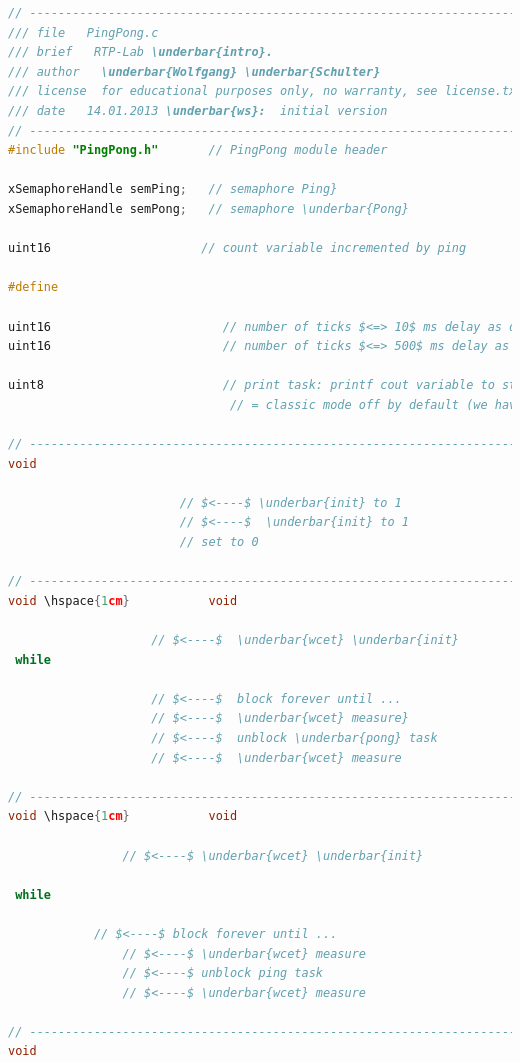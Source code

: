 \begin{lstlisting}[style=mystyle, language=c]
// ----------------------------------------------------------------------------
/// file   PingPong.c
/// brief   RTP-Lab \underbar{intro}.
/// author   \underbar{Wolfgang} \underbar{Schulter} 
/// license  for educational purposes only, no warranty, see license.txt
/// date   14.01.2013 \underbar{ws}:  initial version
// ----------------------------------------------------------------------------
#include "PingPong.h"       // PingPong module header

xSemaphoreHandle semPing;   // semaphore Ping}
xSemaphoreHandle semPong;   // semaphore \underbar{Pong}

uint16     				   // count variable incremented by ping

#define 

uint16  					  // number of ticks $<=> 10$ ms delay as default
uint16  					  // number of ticks $<=> 500$ ms delay as default

uint8   					  // print task: printf cout variable to stdout, if 1
	    					   // = classic mode off by default (we have the GLCD)}

// ----------------------------------------------------------------------------
void 

						// $<----$ \underbar{init} to 1
						// $<----$  \underbar{init} to 1
						// set to 0

// ----------------------------------------------------------------------------
void \hspace{1cm}           void 

					// $<----$  \underbar{wcet} \underbar{init}
 while

					// $<----$  block forever until ...
					// $<----$  \underbar{wcet} measure}
					// $<----$  unblock \underbar{pong} task
					// $<----$  \underbar{wcet} measure
   					
// ----------------------------------------------------------------------------
void \hspace{1cm}           void 

				// $<----$ \underbar{wcet} \underbar{init}

 while

  			// $<----$ block forever until ...
 		 		// $<----$ \underbar{wcet} measure
				// $<----$ unblock ping task
				// $<----$ \underbar{wcet} measure

// ----------------------------------------------------------------------------
void


\end{lstlisting}
